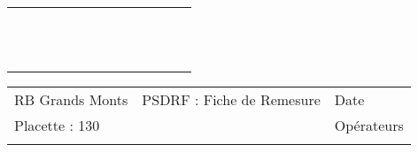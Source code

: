 \documentclass[a4paper, landscape]{article}\usepackage[]{graphicx}\usepackage[]{color}
\begin{document}
{\begin{tabular}{|p{1cm}|p{2cm}|p{1.6cm}|p{1.6cm}|p{1.6cm}|p{1.6cm}|p{1.5cm}|p{1.5cm}|p{1.5cm}|p{1.5cm}|p{1.5cm}|p{7.5cm}|p{5cm}|}
   \hline
 &  &  &  &  &  &  &  &  &  &  &  &  \\ 
   \rowcolor[gray]{0.95} \hline
 &  &  &  &  &  &  &  &  &  &  &  &  \\ 
   \hline
 &  &  &  &  &  &  &  &  &  &  &  &  \\ 
   \rowcolor[gray]{0.95} \hline
 &  &  &  &  &  &  &  &  &  &  &  &  \\ 
   \hline
 &  &  &  &  &  &  &  &  &  &  &  &  \\ 
   \rowcolor[gray]{0.95} \hline
 &  &  &  &  &  &  &  &  &  &  &  &  \\ 
   \hline
 &  &  &  &  &  &  &  &  &  &  &  &  \\ 
   \rowcolor[gray]{0.95} \hline
 &  &  &  &  &  &  &  &  &  &  &  &  \\ 
   \hline
 &  &  &  &  &  &  &  &  &  &  &  &  \\ 
   \rowcolor[gray]{0.95} \hline
 &  &  &  &  &  &  &  &  &  &  &  &  \\ 
   \hline
 &  &  &  &  &  &  &  &  &  &  &  &  \\ 
   \rowcolor[gray]{0.95} \hline
 &  &  &  &  &  &  &  &  &  &  &  &  \\ 
   \hline
\end{tabular}
}

\begin{tabular}{p{10cm}p{10cm}p{8cm}}
  RB Grands Monts & PSDRF : Fiche de Remesure & Date \\ 
  Placette : 130 &  & Opérateurs \\ 
   &  &  \\ 
  \end{tabular}
\end{document}

